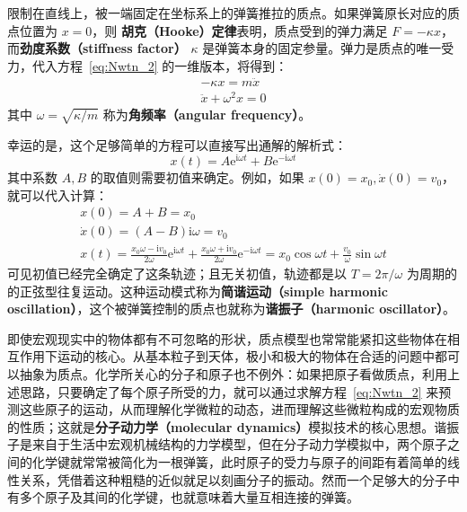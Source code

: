 \documentclass[cn,10pt,math=newtx,citestyle=gb7714-2015,bibstyle=gb7714-2015]{elegantbook}
\def\e{\mathrm e}
\def\i{\mathrm i}
\begin{document}
\begin{instance}[谐振子]
    限制在直线上，被一端固定在坐标系上的弹簧推拉的质点。如果弹簧原长对应的质点位置为 $x=0$，则 \textbf{胡克（Hooke）定律}表明，质点受到的弹力满足 $F=-\kappa x$，而\textbf{劲度系数（stiffness factor）} $\kappa$ 是弹簧本身的固定参量。弹力是质点的唯一受力，代入方程~\ref{eq:Nwtn_2} 的一维版本，将得到：
    \begin{gather*}
        -\kappa x = m\ddot{x}\nonumber\\
        \ddot{x} + \omega^2 x=0
    \end{gather*}
    其中 $\omega=\sqrt{\kappa/m}$ 称为\textbf{角频率（angular frequency）}。
    
    幸运的是，这个足够简单的方程可以直接写出通解的解析式：
    \begin{equation*}
        x(t) = A\e^{\i\omega t}+B\e^{-\i\omega t}
    \end{equation*}
    其中系数 $A,B$ 的取值则需要初值来确定。例如，如果 $x(0)=x_0,\dot{x}(0)=v_0$，就可以代入计算：
    \begin{gather}\label{eq:1hrmnc_oscltr}
        x(0) = A+B=x_0\nonumber\\
        \dot{x}(0) =(A-B)\i\omega = v_0\nonumber\\
        x(t)= \frac{x_0\omega-\i v_0}{2\omega}\e^{\i\omega t}+\frac{x_0\omega+\i v_0}{2\omega}\e^{-\i\omega t}=x_0\cos\omega t+\frac{v_0}{\omega}\sin{\omega t}
    \end{gather}
    可见初值已经完全确定了这条轨迹；且无关初值，轨迹都是以 $T=2\pi/\omega$ 为周期的的正弦型往复运动。这种运动模式称为\textbf{简谐运动（simple harmonic oscillation）}，这个被弹簧控制的质点也就称为\textbf{谐振子（harmonic oscillator）}。
\end{instance}


即使宏观现实中的物体都有不可忽略的形状，质点模型也常常能紧扣这些物体在相互作用下运动的核心。从基本粒子到天体，极小和极大的物体在合适的问题中都可以抽象为质点。化学所关心的分子和原子也不例外：如果把原子看做质点，利用上述思路，只要确定了每个原子所受的力，就可以通过求解方程~\ref{eq:Nwtn_2} 来预测这些原子的运动，从而理解化学微粒的动态，进而理解这些微粒构成的宏观物质的性质；这就是\textbf{分子动力学（molecular dynamics）}模拟技术的核心思想。谐振子是来自于生活中宏观机械结构的力学模型，但在分子动力学模拟中，两个原子之间的化学键就常常被简化为一根弹簧，此时原子的受力与原子的间距有着简单的线性关系，凭借着这种粗糙的近似就足以刻画分子的振动。然而一个足够大的分子中有多个原子及其间的化学键，也就意味着大量互相连接的弹簧。
\end{document}
